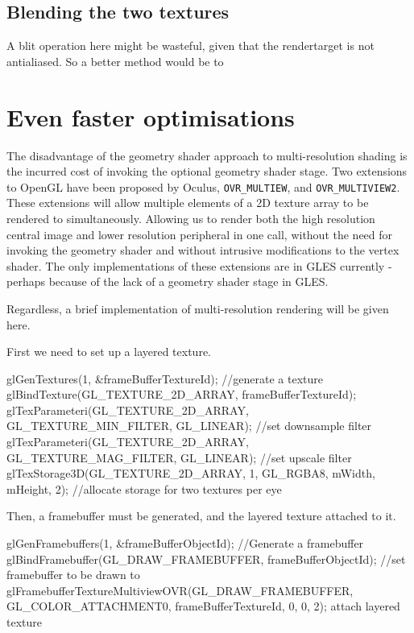 \documentclass[12pt,a4paper,twoside,openright]{report}
\begin{document}
\subsection{Blending the two textures}

A blit operation here might be wasteful, given that the rendertarget is not antialiased. So a better method would be to 

\section{Even faster optimisations}

The disadvantage of the geometry shader approach to multi-resolution shading is the incurred cost of invoking the optional geometry shader stage.
Two extensions to OpenGL have been proposed by Oculus, \texttt{OVR\_MULTIEW}, and \texttt{OVR\_MULTIVIEW2}. These extensions will allow multiple elements of a 2D texture array to be rendered to simultaneously. Allowing us to render both the high resolution central image and lower resolution peripheral in one call, without the need for invoking the geometry shader and without intrusive modifications to the vertex shader. The only implementations of these extensions are in GLES currently - perhaps because of the lack of a geometry shader stage in GLES.

Regardless, a brief implementation of multi-resolution rendering will be given here.

First we need to set up a layered texture.

\begin{blockcode}
glGenTextures(1, &frameBufferTextureId); //generate a texture
glBindTexture(GL_TEXTURE_2D_ARRAY, frameBufferTextureId);
glTexParameteri(GL_TEXTURE_2D_ARRAY, GL_TEXTURE_MIN_FILTER, GL_LINEAR); //set downsample filter
glTexParameteri(GL_TEXTURE_2D_ARRAY, GL_TEXTURE_MAG_FILTER, GL_LINEAR); //set upscale filter
glTexStorage3D(GL_TEXTURE_2D_ARRAY, 1, GL_RGBA8, mWidth, mHeight, 2); //allocate storage for two textures per eye
\end{blockcode}

Then, a framebuffer must be generated, and the layered texture attached to it.

\begin{blockcode}
glGenFramebuffers(1, &frameBufferObjectId); //Generate a framebuffer
glBindFramebuffer(GL_DRAW_FRAMEBUFFER, frameBufferObjectId); //set framebuffer to be drawn to
glFramebufferTextureMultiviewOVR(GL_DRAW_FRAMEBUFFER, GL_COLOR_ATTACHMENT0, frameBufferTextureId, 0, 0, 2); attach layered texture
\end{blockcode}
\end{document}
